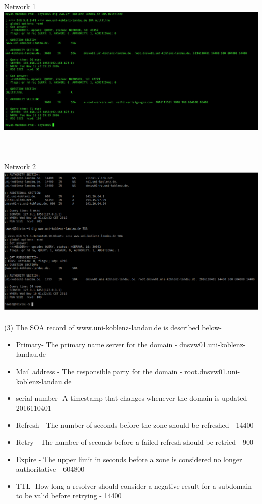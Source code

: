 \documentclass{WeSTassignment}
\begin{document}
Network 1 \\
\includegraphics[width=1\textwidth]{images/net-com2.png} \\ \\ \\ \\
Network 2 \\
\includegraphics[width=1\textwidth]{images/net2-com2.png} \\ \\
(3) The SOA record of www.uni-koblenz-landau.de is described below- \\
\begin{itemize}
	\item Primary- The primary name server for the domain - dnsvw01.uni-koblenz-landau.de \\
	\item Mail address - The responsible party for the domain - root.dnsvw01.uni-koblenz-landau.de \\
	\item serial number- A timestamp that changes whenever the domain is updated - 2016110401 \\
	\item Refresh - The number of seconds before the zone should be refreshed - 14400 \\
	\item Retry - The number of seconds before a failed refresh should be retried - 900 \\
	\item Expire - The upper limit in seconds before a zone is considered no longer authoritative - 604800 \\
	\item TTL -How long a resolver should consider a negative result for a subdomain to be valid before retrying - 14400 \\
\end{itemize}
\end{document}
